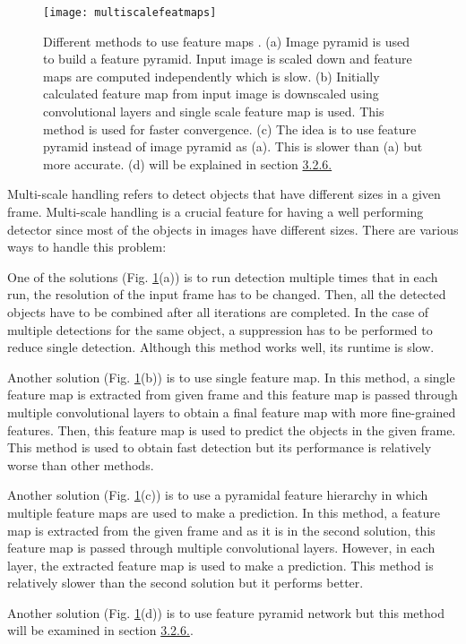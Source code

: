 \documentclass{article}
\begin{document}
\setlength{\parindent}{6ex}

\begin{figure}
    \centering
    \texttt{[image: multiscalefeatmaps]}
    \caption{Different methods to use feature maps \cite{fpncite}. 
    (a) Image pyramid is used to build a feature pyramid. Input image is 
    scaled down and feature maps are computed independently which is slow.
    (b) Initially calculated feature map from input image is downscaled using 
    convolutional layers and single scale feature map is used. This method is 
    used for faster convergence. 
    (c) The idea is to use feature pyramid instead of image pyramid as (a). 
    This is slower than (a) but more accurate. 
    (d) will be explained in section \hyperref[sec:fpnref]{3.2.6.}}
    \label{fig:multiscalefeatmaps1}
\end{figure}

\indent

Multi-scale handling refers to detect objects that have different 
sizes in a given frame. Multi-scale handling is a crucial feature for 
having a well performing detector since most of the objects in images
have different sizes. There are various ways to handle this problem: \par

One of the solutions (Fig. \ref{fig:multiscalefeatmaps1}(a)) is to run detection multiple times that in each 
run, the resolution of the input frame has to be changed. Then, all the 
detected objects have to be combined after all iterations are completed. 
In the case of multiple detections for the same object, a suppression has to be 
performed to reduce single detection. Although this method works well, 
its runtime is slow. \par

Another solution (Fig. \ref{fig:multiscalefeatmaps1}(b)) is to use single feature map. In this method, a single 
feature map is extracted from given frame and this feature map is passed 
through multiple convolutional layers to obtain a final feature map with 
more fine-grained features. Then, this feature map is used to predict the 
objects in the given frame. This method is used to obtain fast detection but 
its performance is relatively worse than other methods. \par

Another solution (Fig. \ref{fig:multiscalefeatmaps1}(c)) is to use a pyramidal feature hierarchy in which multiple 
feature maps are used to make a prediction. In this method, a feature map 
is extracted from the given frame and as it is in the second solution, this 
feature map is passed through multiple convolutional layers. However, 
in each layer, the extracted feature map is used to make a prediction. This 
method is relatively slower than the second solution but it performs better. \par

Another solution (Fig. \ref{fig:multiscalefeatmaps1}(d)) is to use feature pyramid network but this method will be 
examined in section \hyperref[sec:fpnref]{3.2.6.}. 
\end{document}
